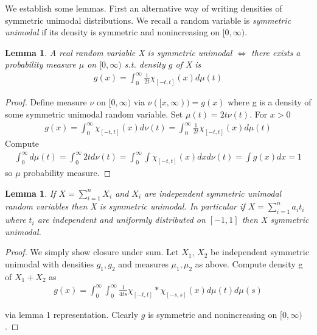 \documentclass[10pt]{article}
\newcommand{\1}{\textbf{1}}
\newtheorem{lemma}[theorem]{Lemma}
\theoremstyle{remark}
\theoremstyle{definition}
\begin{document}


We establish some lemmas. First an alternative way of writing densities of symmetric unimodal distributions. We recall a random variable is \textit{symmetric unimodal} if its density is symmetric and nonincreasing on $[0,\infty)$. 

\begin{lemma}
	A real random variable X is symmetric unimodal $\iff$ there exists a probability measure $\mu$ on $[0,\infty)$ s.t. density $g$ of X is 
	\begin{align*}
		g(x) = \int_0^{\infty}\frac{1}{2t}\chi_{[-t,t]}(x)d\mu(t)
	\end{align*}
\end{lemma}

\begin{proof}
	Define measure $\nu$ on $[0,\infty)$ via $\nu([x,\infty)) = g(x)$ where g is a density of some symmetric unimodal random variable. Set $\mu(t) = 2 t\nu(t)$. For $x > 0$
	\begin{align*}
		g(x) = \int_0^{\infty}\chi_{[-t,t]}(x) d\nu(t) = \int_0^{\infty} \frac{1}{2t}\chi_{[-t,t]}(x)d\mu(t)
	\end{align*}
	Compute
	\begin{align*}
		\int_0^{\infty}d\mu(t) = \int_0^{\infty} 2td\nu(t) = \int_0^{\infty} \int \chi_{[-t,t]}(x)dxd\nu(t) = \int g(x) dx = 1
	\end{align*}
	so $\mu$ probability measure.
\end{proof}

\begin{lemma}
	If $X = \sum_{i=1}^n X_i$ and $X_i$ are independent symmetric unimodal random variables then X is symmetric unimodal. In particular if $X = \sum_{i=1}^n a_i t_i$ where $t_i$ are independent and uniformly distributed on $[-1,1]$ then X symmetric unimodal. 
\end{lemma}

\begin{proof}
	We simply show closure under sum. Let $X_1$, $X_2$ be independent symmetric unimodal with densities $g_1,g_2$ and measures $\mu_1,\mu_2$ as above. Compute density g of $X_1 + X_2$ as 
	\begin{align*}
		g(x) = \int_0^{\infty} \int_0^{\infty} \frac{1}{4ts}\chi_{[-t,t]} * \chi_{[-s,s]}(x)d\mu(t)d\mu(s)
	\end{align*}

	via lemma 1 representation. Clearly $g$ is symmetric and nonincreasing on $[0,\infty)$. 
\end{proof}
\end{document}
